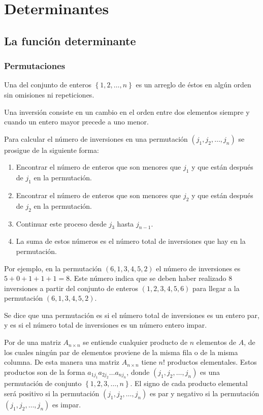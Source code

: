 \documentclass[a4paper,12pt]{article}
\begin{document}
\section{Determinantes}

\subsection{La función determinante}

\subsubsection{Permutaciones}

\begin{concept}
  Una  del conjunto de enteros $\left\{ 1,2,\ldots,n \right\}$
  es un arreglo de éstos en algún orden sin omisiones ni repeticiones.
\end{concept}

Una inversión consiste en un cambio en el orden entre dos elementos siempre y
cuando un entero mayor precede a uno menor.

Para calcular el número de inversiones en una permutación
$(j_1,j_2,\ldots,j_n)$ se prosigue de la siguiente forma:
\begin{enumerate}
  \item Encontrar el número de enteros que son menores que $j_1$ y que están
    después de $j_1$ en la permutación.
  \item Encontrar el número de enteros que son menores que $j_2$ y que están
    después de $j_2$ en la permutación.
  \item Continuar este proceso desde $j_3$ hasta $j_{n-1}$.
  \item La suma de estos números es el número total de inversiones que hay en
    la permutación.
\end{enumerate}
Por ejemplo, en la permutación $(6,1,3,4,5,2)$ el número de inversiones es
$5+0+1+1+1=8$. Este número indica que se deben haber realizado 8 inversiones a
partir del conjunto de enteros $(1,2,3,4,5,6)$ para llegar a la permutación
$(6,1,3,4,5,2)$.

Se dice que una permutación es  si el número total de inversiones es
un entero par, y es  si el número total de inversiones es un número
entero impar.

Por  de una matriz $A_{n\times n}$ se entiende cualquier producto
de $n$ elementos de $A$, de los cuales ningún par de elementos proviene de la
misma fila o de la misma columna. De esta manera una matriz $A_{n\times n}$
tiene $n!$ productos elementales. Estos productos son de la forma
$a_{1j_1}a_{2j_2}\ldots a_{nj_n}$, donde $(j_1,j_2,\ldots,j_n)$ es una
permutación de conjunto $\left\{ 1,2,3,\ldots,n \right\}$. El signo de cada producto
elemental será positivo si la permutación $(j_1,j_2,\ldots,j_n)$ es par y
negativo si la permutación $(j_1,j_2,\ldots,j_n)$ es impar.
\end{document}
